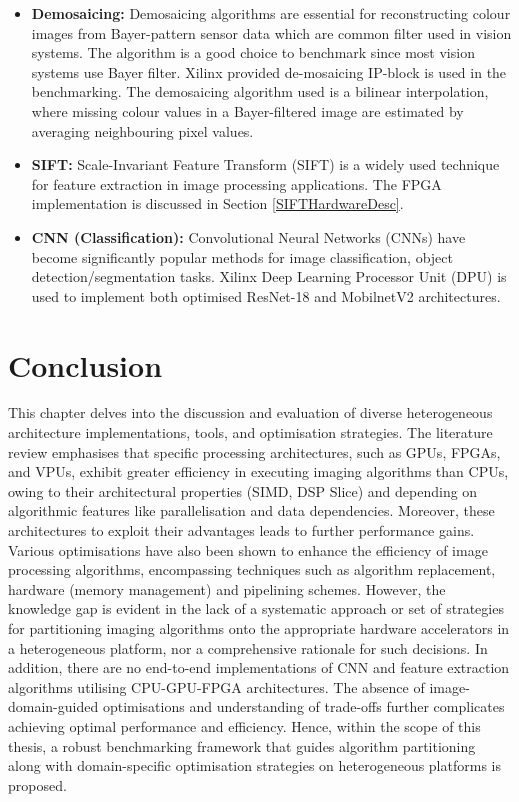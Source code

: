 \begin{itemize}
    \item \textbf{Demosaicing:} Demosaicing algorithms are essential for reconstructing colour images from Bayer-pattern sensor data which are common filter used in vision systems. The algorithm is a good choice to benchmark since most vision systems use Bayer filter. Xilinx provided de-mosaicing IP-block\cite{AMDDemosiac} is used in the benchmarking. The demosaicing algorithm used is a bilinear interpolation, where missing colour values in a Bayer-filtered image are estimated by averaging neighbouring pixel values.
    
    \item \textbf{SIFT:} Scale-Invariant Feature Transform (SIFT) is a widely used technique for feature extraction in image processing applications. The FPGA implementation is discussed in Section \ref{SIFTHardwareDesc}.
    
    \item \textbf{CNN (Classification):} Convolutional Neural Networks (CNNs) have become significantly popular methods for image classification, object detection/segmentation tasks. Xilinx Deep Learning Processor Unit (DPU) is used to implement both optimised ResNet-18 and MobilnetV2 architectures\cite{AMDDPU}.
\end{itemize}


\section{Conclusion}
This chapter delves into the discussion and evaluation of diverse heterogeneous architecture implementations, tools, and optimisation strategies. The literature review emphasises that specific processing architectures, such as GPUs, FPGAs, and VPUs, exhibit greater efficiency in executing imaging algorithms than CPUs, owing to their architectural properties (\eg SIMD, DSP Slice) and depending on algorithmic features like parallelisation and data dependencies. Moreover, these architectures to exploit their advantages leads to further performance gains. Various optimisations have also been shown to enhance the efficiency of image processing algorithms, encompassing techniques such as algorithm replacement, hardware (memory management) and pipelining schemes. However, the knowledge gap is evident in the lack of a systematic approach or set of strategies for partitioning imaging algorithms onto the appropriate hardware accelerators in a heterogeneous platform, nor a comprehensive rationale for such decisions. In addition, there are no end-to-end implementations of CNN and feature extraction algorithms utilising CPU-GPU-FPGA architectures. The absence of image-domain-guided optimisations and understanding of trade-offs further complicates achieving optimal performance and efficiency. Hence, within the scope of this thesis, a robust benchmarking framework that guides algorithm partitioning along with domain-specific optimisation strategies on heterogeneous platforms is proposed.